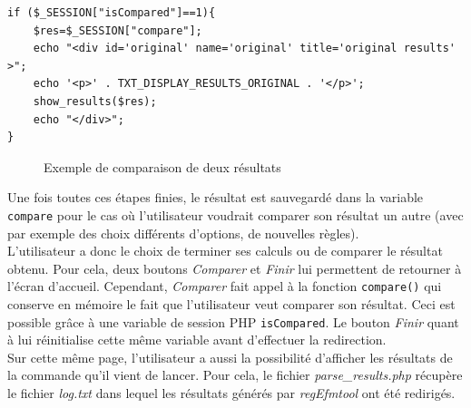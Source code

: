 \begin{DDbox}{\linewidth}
\begin{lstlisting}
if ($_SESSION["isCompared"]==1){
	$res=$_SESSION["compare"];
	echo "<div id='original' name='original' title='original results' >";
	echo '<p>' . TXT_DISPLAY_RESULTS_ORIGINAL . '</p>';
	show_results($res);
	echo "</div>";
}
\end{lstlisting}
\end{DDbox}

\begin{figure}[!ht]
    \begin{center}
        		\caption{Exemple de comparaison de deux résultats}
          \label{comparaison}
      \end{center}   
\end{figure}

Une fois toutes ces étapes finies, le résultat est sauvegardé dans la variable \texttt{compare} pour le cas où l'utilisateur voudrait comparer son résultat un autre (avec par exemple des choix différents d'options, de nouvelles règles).\\

L'utilisateur a donc le choix de terminer ses calculs ou de comparer le résultat obtenu. Pour cela, deux boutons \textit{Comparer} et \textit{Finir} lui permettent de retourner à l'écran d'accueil. Cependant, \textit{Comparer} fait appel à la fonction \texttt{compare()}  qui conserve en mémoire le fait que l'utilisateur veut comparer son résultat. Ceci est possible grâce à une variable de session PHP \texttt{isCompared}. Le bouton \textit{Finir} quant à lui réinitialise cette m\^eme variable avant d'effectuer la redirection.\\

Sur cette même page, l'utilisateur a aussi la possibilité d'afficher les résultats de la commande qu'il vient de lancer. Pour cela, le fichier \emph{parse\_results.php} récupère le fichier \emph{log.txt} dans lequel les résultats générés par \textit{regEfmtool} ont été redirigés. \\

